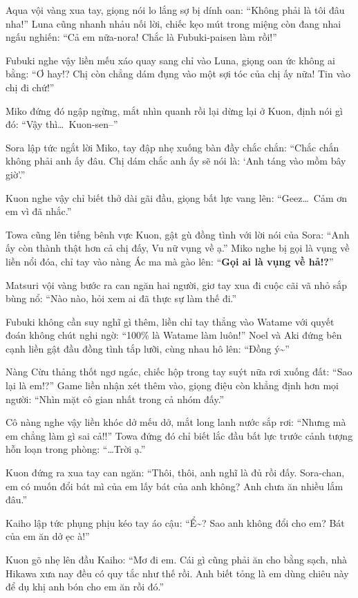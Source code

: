 \documentclass[../main.tex]{subfiles}
\begin{document}
Aqua vội vàng xua tay, giọng nói lo lắng sợ bị dính oan: ``Không phải là tôi đâu nha!'' Luna cũng nhanh nhảu nối lời, chiếc kẹo mút trong miệng còn đang nhai ngấu nghiến: ``Cả em nữa-nora! Chắc là Fubuki-paisen làm rồi!''

Fubuki nghe vậy liền mếu xáo quay sang chỉ vào Luna, giọng oan ức không ai bằng: ``Ơ hay!? Chị còn chẳng dám đụng vào một sợi tóc của chị ấy nữa! Tin vào chị đi chứ!''

Miko đứng đó ngập ngừng, mắt nhìn quanh rồi lại dừng lại ở Kuon, định nói gì đó: ``Vậy thì\dots\ Kuon-sen--''

Sora lập tức ngắt lời Miko, tay đập nhẹ xuống bàn đầy chắc chắn: ``Chắc chắn không phải anh ấy đâu. Chị dám chắc anh ấy sẽ nói là: `Anh táng vào mồm bây giờ'.''

Kuon nghe vậy chỉ biết thở dài gãi đầu, giọng bất lực vang lên: ``Geez\dots\ Cảm ơn em vì đã nhắc.''

Towa cũng lên tiếng bênh vực Kuon, gật gù đồng tình với lời nói của Sora: ``Anh ấy còn thành thật hơn cả chị đấy, Vu nữ vụng về ạ.'' Miko nghe bị gọi là vụng về liền nổi đóa, chỉ tay vào nàng Ác ma mà gào lên: ``\textbf{Gọi ai là vụng về hả!?}''

Matsuri vội vàng bước ra can ngăn hai người, giơ tay xua đi cuộc cãi vã nhỏ sắp bùng nổ: ``Nào nào, hỏi xem ai đã thực sự làm thế đi.''

Fubuki không cần suy nghĩ gì thêm, liền chỉ tay thẳng vào Watame với quyết đoán không chút nghi ngờ: ``100\% là Watame làm luôn!'' Noel và Aki đứng bên cạnh liền gật đầu đồng tình tắp lưỡi, cùng nhau hô lên: ``Đồng ý\~{}''

Nàng Cừu thảng thốt ngơ ngác, chiếc hộp trong tay suýt nữa rơi xuống đất: ``Sao lại là em!?'' Game liền nhận xét thêm vào, giọng điệu còn khẳng định hơn mọi người: ``Nhìn mặt cô gian nhất trong cả nhóm đấy.''

Cô nàng nghe vậy liền khóc dở mếu dở, mắt long lanh nước sắp rơi: ``Nhưng mà em chẳng làm gì sai cả!!'' Towa đứng đó chỉ biết lắc đầu bất lực trước cảnh tượng hỗn loạn trong phòng: ``\dots Trời ạ.''

Kuon đứng ra xua tay can ngăn: ``Thôi, thôi, anh nghĩ là đủ rồi đấy. Sora-chan, em có muốn đổi bát mì của em lấy bát của anh không? Anh chưa ăn nhiều lắm đâu.''

Kaiho lập tức phụng phịu kéo tay áo cậu: ``Ể\~{}? Sao anh không đổi cho em? Bát của em ăn dở ẹc à!''

Kuon gõ nhẹ lên đầu Kaiho: ``Mơ đi em. Cái gì cũng phải ăn cho bằng sạch, nhà Hikawa xưa nay đều có quy tắc như thế rồi. Anh biết tỏng là em dùng chiêu này để dụ khị anh bón cho em ăn rồi đó.''
\end{document}
